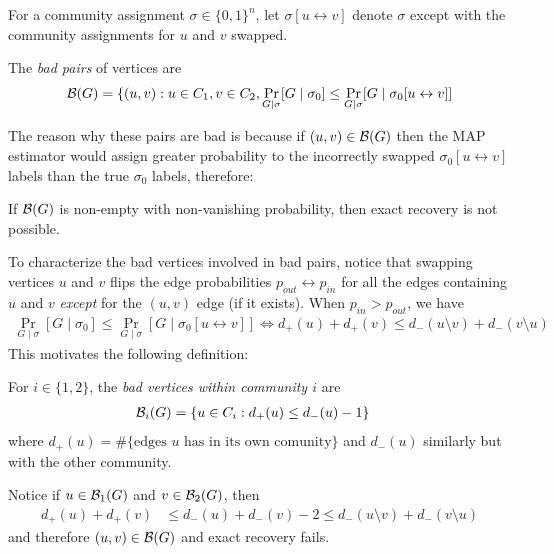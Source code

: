 \begin{definition}
  For a community assignment $\sigma \in \{0,1\}^n$, let
  $\sigma[u \leftrightarrow v]$ denote $\sigma$ except with
  the community assignments for $u$ and $v$ swapped.

  The \emph{bad pairs} of vertices are
  \begin{align}
    \mathcal{B}(G)
    = \{ (u,v) :
      u \in C_1, v \in C_2, \Pr_{G \mid \sigma}[G \mid \sigma_0]
      \leq \Pr_{G \mid \sigma}[G \mid \sigma_0[u \leftrightarrow v]]
  \end{align}
\end{definition}

The reason why these pairs are bad is because if $(u,v) \in \mathcal{B}(G)$
then the MAP estimator would assign greater probability
to the incorrectly swapped $\sigma_0[u \leftrightarrow v]$
labels than the true $\sigma_0$ labels, therefore:
\begin{corollary}
  If $\mathcal{B}(G)$ is non-empty with non-vanishing probability,
  then exact recovery is not possible.
\end{corollary}
To characterize the bad vertices involved in bad pairs, notice
that swapping vertices $u$ and $v$ flips the edge probabilities
$p_{out} \leftrightarrow p_{in}$ for all the edges containing
$u$ and $v$ \emph{except} for the $(u,v)$ edge (if it exists).
When $p_{in} > p_{out}$, we have
\begin{align}
  \Pr_{G \mid \sigma}[G \mid \sigma_0]
  \leq\Pr_{G \mid \sigma}[G \mid \sigma_0[u \leftrightarrow v]]
  \iff
  d_+(u) + d_+(v) \leq d_-(u \setminus v) + d_-(v \setminus u)
\end{align}
This motivates the following definition:
\begin{definition}
  For $i \in \{1,2\}$, the \emph{bad vertices within community $i$} are
  \begin{align}
    \mathcal{B}_i(G) &= \{u \in C_i : d_+(u) \leq d_-(u) - 1 \}
  \end{align}
  where $d_+(u) = \#\{\text{edges $u$ has in its own comunity}\}$
  and $d_-(u)$ similarly but with the other community.
\end{definition}
Notice if $u \in \mathcal{B}_1(G)$ and $v \in \mathcal{B}_2(G)$, then
\begin{align}
  d_+(u) + d_+(v)
  &\leq d_-(u) + d_-(v) - 2
  \leq d_-(u \setminus v) + d_-(v \setminus u)
\end{align}
and therefore $(u,v) \in \mathcal{B}(G)$ and exact recovery fails.

